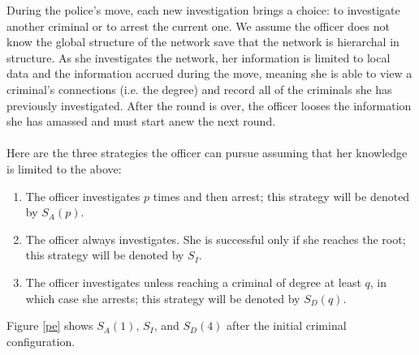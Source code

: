 \documentclass[%
 reprint,
 amsmath,amssymb,
 aps,
]{revtex4-1}
\theoremstyle{plain}
\theoremstyle{definition}
\begin{document}
During the police's move, each new investigation brings a choice: to investigate another criminal or to arrest the current one.  We assume the officer does not know the global structure of the network save that the network is hierarchal in structure.  As she investigates the network, her information is limited to local data and the information accrued during the move, meaning she is able to view a criminal's connections (i.e. the degree) and record all of the criminals she has previously investigated.  After the round is over, the officer looses the information she has amassed and must start anew the next round.\\
\\
Here are the three strategies the officer can pursue assuming that her knowledge is limited to the above:
\begin{enumerate}
[label=(\arabic*)]
\item The officer investigates $p$ times and then arrest; this strategy will be denoted by $S_{A}(p)$.
\item The officer always investigates.  She is successful only if she reaches the root; this strategy will be denoted by $S_{I}$.
\item The officer investigates unless reaching a criminal of degree at least $q$, in which case she arrests; this strategy will be denoted by $S_{D}(q)$.
\end{enumerate}
Figure \ref{pe} shows $S_A(1)$, $S_I$, and $S_D(4)$ after the initial criminal configuration.
\end{document}
